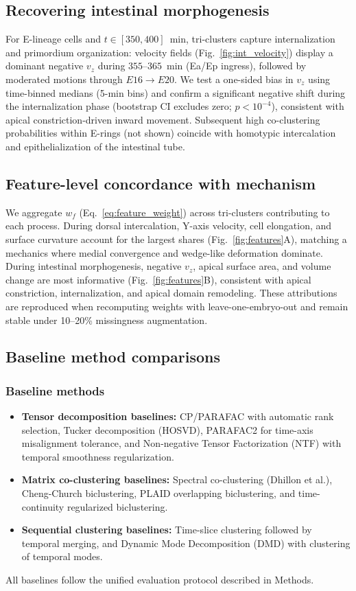 \documentclass[unnumsec,webpdf,modern,large,namedate]{oup-authoring-template}%
\theoremstyle{thmstyleone}\newtheorem{theorem}{Theorem}
\theoremstyle{thmstyletwo}\newtheorem{example}{Example}
\theoremstyle{thmstylethree}\newtheorem{definition}{Definition}
\begin{document}
\subsection{Recovering intestinal morphogenesis}
\label{subsec:val_int}
For E-lineage cells and $t\in[350,400]$~min, tri-clusters capture internalization and primordium organization: velocity fields (Fig.~\ref{fig:int_velocity}) display a dominant negative $v_z$ during $355$--$365$~min (Ea/Ep ingress), followed by moderated motions through $E16\to E20$. We test a one-sided bias in $v_z$ using time-binned medians (5-min bins) and confirm a significant negative shift during the internalization phase (bootstrap CI excludes zero; $p<10^{-4}$), consistent with apical constriction-driven inward movement. Subsequent high co-clustering probabilities within E-rings (not shown) coincide with homotypic intercalation and epithelialization of the intestinal tube.

\subsection{Feature-level concordance with mechanism}
\label{subsec:val_features}
We aggregate $w_f$ (Eq.~\ref{eq:feature_weight}) across tri-clusters contributing to each process. During dorsal intercalation, Y-axis velocity, cell elongation, and surface curvature account for the largest shares (Fig.~\ref{fig:features}A), matching a mechanics where medial convergence and wedge-like deformation dominate. During intestinal morphogenesis, negative $v_z$, apical surface area, and volume change are most informative (Fig.~\ref{fig:features}B), consistent with apical constriction, internalization, and apical domain remodeling. These attributions are reproduced when recomputing weights with leave-one-embryo-out and remain stable under 10–20\% missingness augmentation.

\subsection{Baseline method comparisons}

\subsubsection{Baseline methods}
\begin{itemize}
\item \textbf{Tensor decomposition baselines:} CP/PARAFAC with automatic rank selection, Tucker decomposition (HOSVD), PARAFAC2 for time-axis misalignment tolerance, and Non-negative Tensor Factorization (NTF) with temporal smoothness regularization.
\item \textbf{Matrix co-clustering baselines:} Spectral co-clustering (Dhillon et al.), Cheng-Church biclustering, PLAID overlapping biclustering, and time-continuity regularized biclustering.
\item \textbf{Sequential clustering baselines:} Time-slice clustering followed by temporal merging, and Dynamic Mode Decomposition (DMD) with clustering of temporal modes.
\end{itemize}
All baselines follow the unified evaluation protocol described in Methods.
\end{document}
